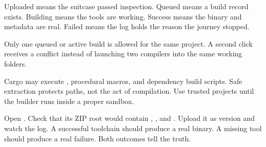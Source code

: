 Uploaded means the suitcase passed inspection. Queued means a build record exists. Building means the tools are working. Success means the binary and metadata are real. Failed means the log holds the reason the journey stopped.

Only one queued or active build is allowed for the same project. A second click receives a conflict instead of launching two compilers into the same working folders.

\begin{warningbox}
Cargo may execute , procedural macros, and dependency build scripts. Safe extraction protects paths, not the act of compilation. Use trusted projects until the builder runs inside a proper sandbox.
\end{warningbox}

\begin{checkpoint}
Open . Check that its ZIP root would contain , , and . Upload it as version  and watch the log. A successful toolchain should produce a real binary. A missing tool should produce a real failure. Both outcomes tell the truth.
\end{checkpoint}

